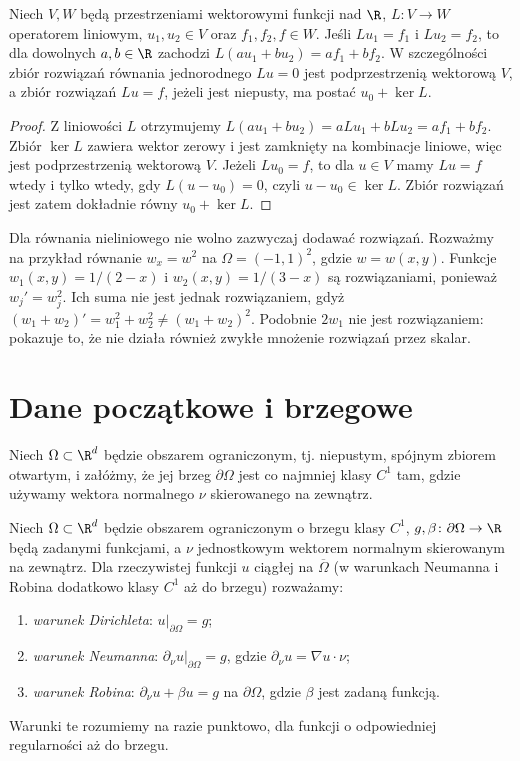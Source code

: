 \begin{stwierdzenie}
Niech $V,W$ będą przestrzeniami wektorowymi funkcji nad $\R$,
$L\colon V\to W$ operatorem liniowym, $u_1,u_2\in V$
oraz $f_1,f_2,f\in W$. Jeśli $Lu_1=f_1$ i
$Lu_2=f_2$, to dla dowolnych $a,b\in\R$ zachodzi
$L(au_1+bu_2)=af_1+bf_2$. W szczególności zbiór rozwiązań
równania jednorodnego $Lu=0$ jest podprzestrzenią wektorową
$V$, a zbiór rozwiązań $Lu=f$, jeżeli jest niepusty,
ma postać $u_0+\ker L$.
\end{stwierdzenie}
\begin{proof}
Z liniowości $L$ otrzymujemy $L(au_1+bu_2)=aLu_1+bLu_2
=af_1+bf_2$. Zbiór $\ker L$ zawiera wektor zerowy i jest zamknięty
na kombinacje liniowe, więc jest podprzestrzenią wektorową $V$.
Jeżeli $Lu_0=f$, to dla $u\in V$ mamy $Lu=f$ wtedy i tylko wtedy,
gdy $L(u-u_0)=0$, czyli $u-u_0\in\ker L$. Zbiór rozwiązań
jest zatem dokładnie równy $u_0+\ker L$.
\end{proof}

\begin{uwaga}
Dla równania nieliniowego nie wolno zazwyczaj dodawać rozwiązań.
Rozważmy na przykład równanie $w_x=w^2$ na
$\Omega=(-1,1)^2$, gdzie $w=w(x,y)$.
Funkcje $w_1(x,y)=1/(2-x)$ i $w_2(x,y)=1/(3-x)$
są rozwiązaniami, ponieważ $w_j'=w_j^2$.
Ich suma nie jest jednak rozwiązaniem, gdyż
$(w_1+w_2)'=w_1^2+w_2^2\ne(w_1+w_2)^2$.
Podobnie $2w_1$ nie jest rozwiązaniem: pokazuje to,
że nie działa również zwykłe mnożenie rozwiązań przez skalar.
\end{uwaga}

\section{Dane początkowe i brzegowe}
\label{sec:pde-data}

Niech $\Omega\subset\R^d$ będzie obszarem ograniczonym, tj.
niepustym, spójnym zbiorem otwartym, i załóżmy, że jej brzeg
$\partial\Omega$ jest co najmniej klasy $C^1$ tam, gdzie używamy
wektora normalnego $\nu$ skierowanego na zewnątrz.

\begin{definicja}
Niech $\Omega\subset\R^d$ będzie obszarem ograniczonym o brzegu
klasy $C^1$, $g,\beta\colon\partial\Omega\to\R$ będą zadanymi
funkcjami, a $\nu$ jednostkowym wektorem normalnym skierowanym
na zewnątrz. Dla rzeczywistej funkcji $u$ ciągłej na
$\overline\Omega$ (w warunkach Neumanna i Robina dodatkowo
klasy $C^1$ aż do brzegu) rozważamy:
\begin{enumerate}
\item \emph{warunek Dirichleta}: $u|_{\partial\Omega}=g$;
\item \emph{warunek Neumanna}: $\partial_\nu u|_{\partial\Omega}=g$,
 gdzie $\partial_\nu u=\nabla u\cdot\nu$;
\item \emph{warunek Robina}: $\partial_\nu u+\beta u=g$
 na $\partial\Omega$, gdzie $\beta$ jest zadaną funkcją.
\end{enumerate}
Warunki te rozumiemy na razie punktowo, dla funkcji o odpowiedniej
regularności aż do brzegu.
\end{definicja}

